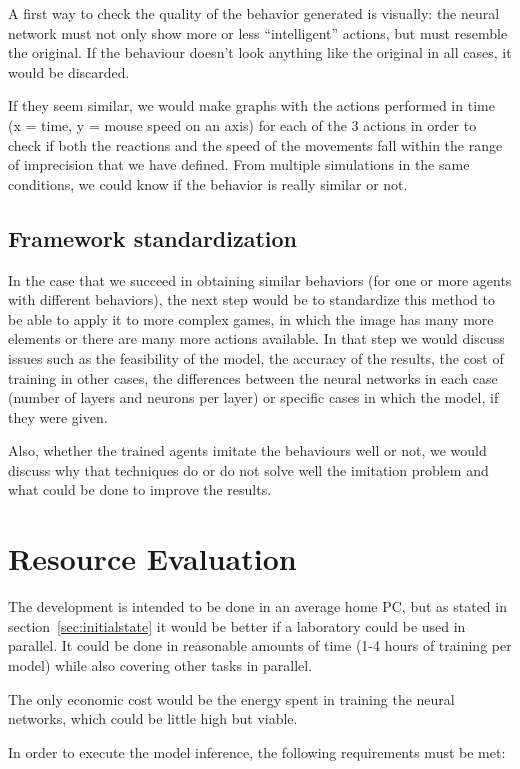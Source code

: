 A first way to check the quality of the behavior generated is visually: the neural network must not only show more or less “intelligent” actions, but must resemble the original. If the behaviour doesn’t look anything like the original in all cases, it would be discarded.

If they seem similar, we would make graphs with the actions performed in time (x = time, y = mouse speed on an axis) for each of the 3 actions in order to check if both the reactions and the speed of the movements fall within the range of imprecision that we have defined. From multiple simulations in the same conditions, we could know if the behavior is really similar or not.

\subsection{Framework standardization}

In the case that we succeed in obtaining similar behaviors (for one or more agents with different behaviors), the next step would be to standardize this method to be able to apply it to more complex games, in which the image has many more elements or there are many more actions available. In that step we would discuss issues such as the feasibility of the model, the accuracy of the results, the cost of training in other cases, the differences between the neural networks in each case (number of layers and neurons per layer) or specific cases in which the model, if they were given.

Also, whether the trained agents imitate the behaviours well or not, we would discuss why that techniques do or do not solve well the imitation problem and what could be done to improve the results.

\section{Resource Evaluation}

The development is intended to be done in an average home PC, but as stated in section~\ref{sec:initialstate} it would be better if a laboratory could be used in parallel. It could be done in reasonable amounts of time (1-4 hours of training per model) while also covering other tasks in parallel.

The only economic cost would be the energy spent in training the neural networks, which could be little high but viable.

In order to execute the model inference, the following requirements must be met:

